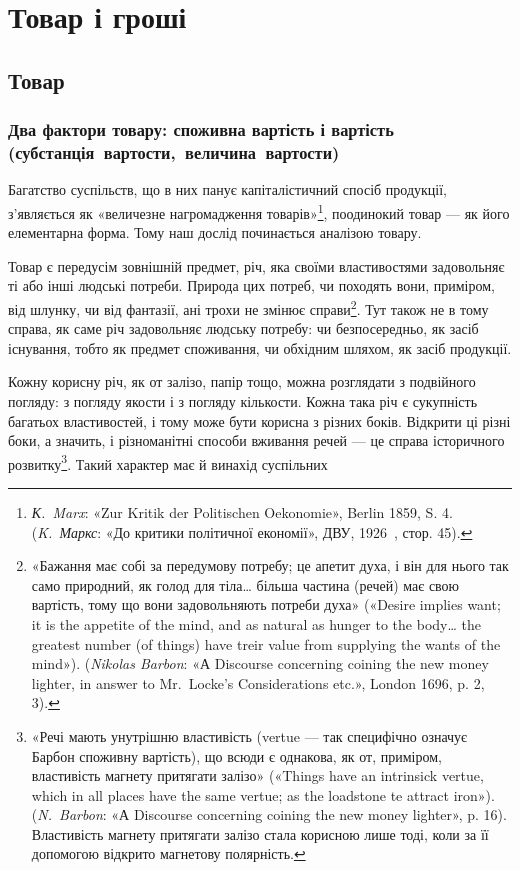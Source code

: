 
\chapter{Товар і гроші}
\section{Товар}
\subsection{Два фактори товару: споживна вартість і вартість
(субстанція~вартости,~величина~вартости)}

Багатство суспільств, що в них панує капіталістичний спосіб
продукції, з’являється як «величезне нагромадження товарів»\footnote{
\emph{К.~Marx}: «Zur Kritik der Politischen Oekonomie», Berlin 1859,
S. 4. (\emph{K.~Маркс}: «До критики політичної економії», ДВУ, 1926~,
стор. 45).
},
поодинокий товар — як його елементарна форма. Тому наш
дослід починається аналізою товару.

Товар є передусім зовнішній предмет, річ, яка своїми властивостями
задовольняє ті або інші людські потреби. Природа цих
потреб, чи походять вони, приміром, від шлунку, чи від фантазії,
ані трохи не змінює справи\footnote{
«Бажання має собі за передумову потребу; це апетит духа, і він
для нього так само природний, як голод для тіла\dots{} більша частина (речей)
має свою вартість, тому що вони задовольняють потреби духа» («Desire
implies want; it is the appetite of the mind, and as natural as hunger to
the body\dots{} the greatest number (of things) have treir value from supplying
the wants of the mind»). (\emph{Nikolas Barbon}: «А Discourse concerning coining
the new money lighter, in answer to Mr.~Locke’s Considerations
etc.», London 1696, p. 2, 3).
}. Тут також не в тому справа, як саме
річ задовольняє людську потребу: чи безпосередньо, як засіб
існування, тобто як предмет споживання, чи обхідним шляхом,
як засіб продукції.

Кожну корисну річ, як от залізо, папір тощо, можна розглядати
з подвійного погляду: з погляду якости і з погляду кількости.
Кожна така річ є сукупність багатьох властивостей, і тому
може бути корисна з різних боків. Відкрити ці різні боки, а значить,
і різноманітні способи вживання речей — це справа історичного
розвитку\footnote{
«Речі мають унутрішню властивість (vertue — так специфічно
означує Барбон споживну вартість), що всюди є однакова, як от, приміром,
властивість магнету притягати залізо» («Things have an intrinsick vertue,
which in all places have the same vertue; as the loadstone te attract iron»).
(\emph{N.~Barbon}: «А Discourse concerning coining the new money lighter»,
p. 16). Властивість магнету притягати залізо стала корисною лише тоді,
коли за її допомогою відкрито магнетову полярність.
}. Такий характер має й винахід суспільних
\parbreak{}  %
